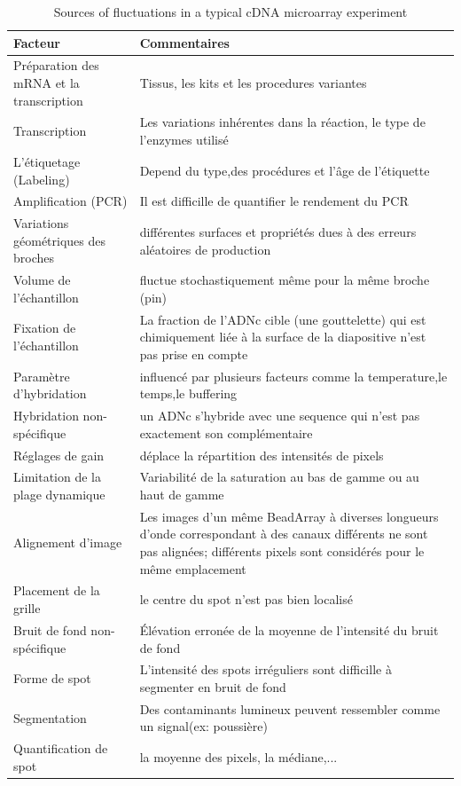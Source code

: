 \documentclass[a4paper,10pt]{article}
\begin{document}
\begin{table}[!ht]
\begin{tabular}{|l|p{6cm}|}
\hline
 Facteur & Commentaires\\
\hline
Préparation des mRNA et la transcription &  Tissus, les kits et les procedures variantes \\
\hline 
Transcription & Les variations inhérentes dans la réaction, le type de l'enzymes utilisé  \\
\hline 
L'étiquetage (Labeling) & Depend du type,des procédures et l'âge de l'étiquette  \\
\hline
Amplification (PCR) & Il est difficille de quantifier le rendement du PCR\\
\hline
Variations géométriques des broches & différentes surfaces et propriétés dues à des erreurs aléatoires de production \\
\hline
Volume de l'échantillon & fluctue stochastiquement même pour la même broche (pin)  \\
\hline
Fixation de l'échantillon & La fraction de l'ADNc cible (une gouttelette) qui est chimiquement liée à la surface de la diapositive n'est pas prise en compte \\
\hline
 Paramètre d'hybridation&  influencé par plusieurs facteurs comme la temperature,le temps,le buffering \\
\hline
 Hybridation non-spécifique& un ADNc s'hybride avec une sequence qui n'est pas exactement son complémentaire \\
\hline
Réglages de gain & déplace la répartition des intensités de pixels \\
\hline
Limitation de la plage dynamique & Variabilité de la saturation au bas de gamme ou au haut de gamme \\
\hline
Alignement d'image & Les images d'un même BeadArray à diverses longueurs d'onde correspondant à des canaux différents ne sont pas alignées; différents pixels sont considérés pour le même emplacement \\
\hline
 Placement de la grille& le centre du spot n’est pas bien localisé  \\
\hline
 Bruit de fond non-spécifique& Élévation erronée de la moyenne de l'intensité du bruit de fond \\
\hline
Forme de spot & L'intensité des spots irréguliers sont difficille à segmenter en bruit de fond \\
\hline
 Segmentation& Des contaminants lumineux peuvent ressembler comme un signal(ex: poussière) \\
\hline
 Quantification de spot& la moyenne des pixels, la médiane,... \\
\hline
\end{tabular}
\caption{Sources of fluctuations in a typical cDNA microarray experiment}
\label{Sources de variation}
\end{table}
\end{document}
